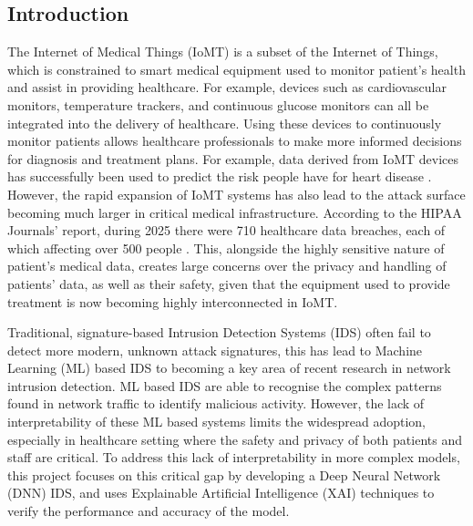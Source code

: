 \documentclass[11pt,a4paper]{article}
\begin{document}
\subsection{Introduction}
The Internet of Medical Things (IoMT) is a subset of the Internet of Things, which is constrained to smart medical equipment
used to monitor patient's health and assist in providing healthcare. For example, devices such as cardiovascular monitors,
temperature trackers, and continuous glucose monitors can all be integrated into the delivery of healthcare. Using these devices
to continuously monitor patients allows healthcare professionals to make more informed decisions for diagnosis and treatment plans.
For example, data derived from IoMT devices has successfully been used to predict the risk people have for heart disease \cite{baseer2024healthcare}.
However, the rapid expansion of IoMT systems has also lead to the attack surface becoming much larger in critical medical
infrastructure. According to the HIPAA Journals' report, during 2025 there were 710 healthcare data breaches, each of
which affecting over 500 people \cite{hipaajournal}. This, alongside the highly sensitive nature of patient's medical data, creates large concerns
over the privacy and handling of patients' data, as well as their safety, given that the equipment used to provide treatment
is now becoming highly interconnected in IoMT.

Traditional, signature-based Intrusion Detection Systems (IDS) often fail to detect more
modern, unknown attack signatures, this has lead to Machine Learning (ML) based IDS to becoming a
key area of recent research in network intrusion detection. ML based IDS are able to recognise the complex patterns found in
network traffic to identify malicious activity. However, the lack of interpretability of these ML based
systems limits the widespread adoption, especially in healthcare setting where the safety and privacy of both patients and staff
are critical. To address this lack of interpretability in more complex models, this project focuses on this critical gap by developing
a Deep Neural Network (DNN) IDS, and uses Explainable Artificial Intelligence (XAI) techniques to verify the performance and accuracy of the model.

%
%
\end{document}
